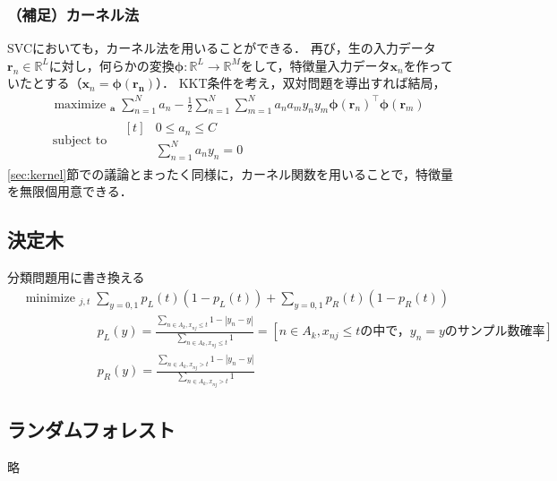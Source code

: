 \documentclass[a4paper,lualatex,ja=standard,oneside,fleqn]{bxjsarticle}
\DeclareMathOperator*{\minimize}{minimize\ }
\DeclareMathOperator*{\maximize}{maximize\ }
\begin{document}
\subsubsection*{（補足）カーネル法}
SVCにおいても，カーネル法を用いることができる．
再び，生の入力データ$\bm{r}_n\in\mathbb{R}^L$に対し，何らかの変換$\bm{\phi}:\mathbb{R}^L\to\mathbb{R}^M$をして，特徴量入力データ$\bm{x}_n$を作っていたとする（$\bm{x}_n=\bm{\phi(\bm{r}_n)}$）．
KKT条件を考え，双対問題を導出すれば結局，
\begin{align*}
  &\maximize_{\bm{a}}\sum_{n=1}^N a_n - \frac{1}{2}\sum_{n=1}^N\sum_{m=1}^N a_na_my_ny_m\bm{\phi}(\bm{r}_n)^\top\bm{\phi}(\bm{r}_m)\\
  &\,\text{subject to}\quad
  \begin{aligned}[t]
    &0\leq a_n\leq C\\
    &\sum_{n=1}^Na_ny_n = 0
  \end{aligned}
\end{align*}
\ref{sec:kernel}節での議論とまったく同様に，カーネル関数を用いることで，特徴量を無限個用意できる．


\subsection{決定木}
分類問題用に書き換える
\begin{align*}
  &\minimize_{j,t} \sum_{y=0,1}p_L(t)(1-p_L(t)) + \sum_{y=0,1}p_R(t)(1-p_R(t))\\
  &\qquad\qquad\qquad p_L(y) = \frac{\displaystyle\sum_{n\in{A_k}, x_{nj}\leq t}1-|y_n-y|}{\displaystyle\sum_{n\in{A_k}, x_{nj}\leq t}1}
  =[\text{$n\in{A_k},x_{nj}\leq t$の中で，$y_n=y$のサンプル数確率}]\\
  &\qquad\qquad\qquad
  p_R(y) = \frac{\displaystyle\sum_{n\in{A_k}, x_{nj}> t}1-|y_n-y|}{\displaystyle\sum_{n\in{A_k}, x_{nj}> t}1}
\end{align*}

\subsection{ランダムフォレスト}
略

\end{document}
